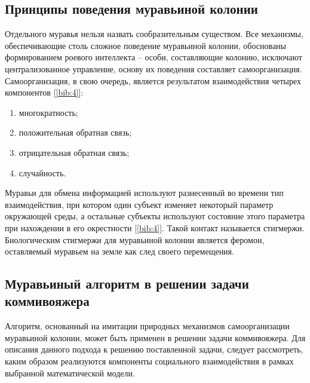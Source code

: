     \subsection*{Принципы поведения муравьиной колонии}

    \par Отдельного муравья нельзя назвать сообразительным существом. Все механизмы, обеспечивающие столь сложное поведение муравьиной колонии, обоснованы формированием роевого интеллекта -- особи, составляющие колонию, исключают централизованное управление, основу их поведения составляет самоорганизация. Самоорганизация, в свою очередь, является результатом взаимодействия четырех компонентов [\ref{bib:4}]:

    \begin{enumerate}
    	\item многократность;
    	\item положительная обратная связь;
    	\item отрицательная обратная связь;
    	\item случайность.
    \end{enumerate}

    \par Муравьи для обмена информацией используют разнесенный во времени тип взаимодействия, при котором один субъект изменяет некоторый параметр окружающей среды, а остальные субъекты используют состояние этого параметра при нахождении в его окрестности [\ref{bib:4}]. Такой контакт называется стигмержи. Биологическим стигмержи для муравьиной колонии является феромон, оставляемый муравьем на земле как след своего перемещения.

    \subsection*{Муравьиный алгоритм в решении задачи коммивояжера}

    \par Алгоритм, основанный на имитации природных механизмов самоорганизации муравьиной колонии, может быть применен в решении задачи коммивояжера. Для описания данного подхода к решению поставленной задачи, следует рассмотреть, каким образом реализуются компоненты социального взаимодействия в рамках выбранной математической модели.

